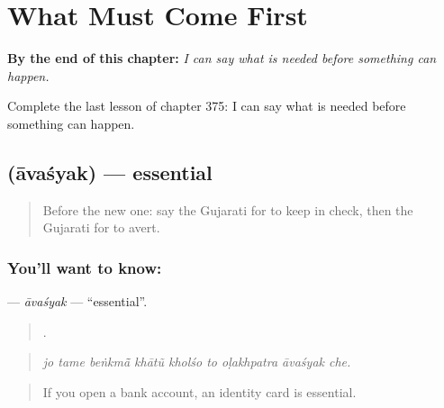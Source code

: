 
\chapter{What Must Come First}
\label{ch:gu-what-must-come-first}

\begin{chapteropening}
\textbf{By the end of this chapter:} \emph{I can say what is needed before something can happen.}

Complete the last lesson of chapter 375: I can say what is needed before something can happen.
\end{chapteropening}

\section[\texorpdfstring{\gu{આવશ્યક} (āvaśyak)}{આવશ્યક (āvaśyak)}]{ (āvaśyak) — essential}

\label{lesson:GU-C375-avasyak}



\begin{quote}
Before the new one: say the Gujarati for to keep in check, then the Gujarati for to avert.
\end{quote}

\subsection*{You'll want to know: }
\textbf{} — \emph{āvaśyak} — \textquotedblleft{}essential\textquotedblright{}.

\begin{quote}
        .
\end{quote}

\begin{quote}
\emph{jo tame beṅkmā̃ khātũ kholśo to oḷakhpatra āvaśyak che.}
\end{quote}

\begin{quote}
If you open a bank account, an identity card is essential.
\end{quote}

